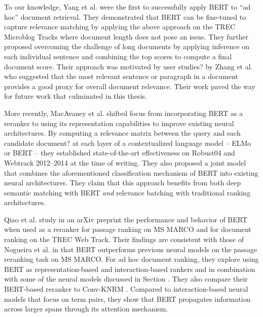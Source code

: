 To our knowledge, Yang et al. \cite{yang2019simple} were the first to successfully apply BERT to ``ad hoc'' document retrieval.
They demonstrated that BERT can be fine-tuned to capture relevance matching by applying the above approach on the TREC Microblog Tracks where document length does not pose an issue.
They further proposed overcoming the challenge of long documents by applying inference on each individual sentence and combining the top scores to compute a final document score.
Their approach was motivated by user studies? by Zhang et al. \cite{zhang2018effective} who suggested that the most relevant sentence or paragraph in a document provides a good proxy for overall document relevance.
Their work paved the way for future work that culminated in this thesis.

More recently, MacAvaney et al. \cite{macavaney2019cedr} shifted focus from incorporating BERT as a reranker to using its representation capabilities to improve existing neural architectures.
By computing a relevance matrix between the query and each candidate document? at each layer of a contextualized language model -- ELMo or BERT --  they established state-of-the-art effectiveness on Robust04 and Webtrack 2012--2014 at the time of writing.
They also proposed a joint model that combines the aforementioned classification mechanism of BERT into existing neural architectures.
They claim that this approach benefits from both deep semantic matching with BERT \textit{and} relevance batching with traditional ranking architectures.

Qiao et al. \cite{Qiao:1904.07531:2019} study in an arXiv preprint the performance and behavior of BERT when used as a reranker for passage ranking on MS MARCO and for document ranking on the TREC Web Track.
Their findings are consistent with those of Nogueira et al. \cite{nogueira2019passage} in that BERT outperforms previous neural models on the passage reranking task on MS MARCO.
For ad hoc document ranking, they explore using BERT as representation-based and interaction-based rankers and in combination with some of the neural models discussed in Section .
They also compare their BERT-based reranker to Conv-KNRM \cite{dai2018convolutional}.
Compared to interaction-based neural models that focus on term pairs, they show that BERT propagates information across larger spans through its attention mechanism.

